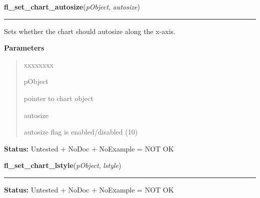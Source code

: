 \hspace{.8\funcindent}\begin{boxedminipage}{\funcwidth}

    \raggedright \textbf{fl\_set\_chart\_autosize}(\textit{pObject}, \textit{autosize})

    \vspace{-1.5ex}

    \rule{\textwidth}{0.5\fboxrule}
\setlength{\parskip}{2ex}
    Sets whether the chart should autosize along the x-axis.

\setlength{\parskip}{1ex}
      \textbf{Parameters}
      \vspace{-1ex}

      \begin{quote}
        \begin{Ventry}{xxxxxxxx}

          \item[pObject]

          pointer to chart object

          \item[autosize]

          autosize flag is enabled/disabled (1{\textbar}0)

        \end{Ventry}

      \end{quote}

\textbf{Status:} Untested + NoDoc + NoExample = NOT OK



    \end{boxedminipage}

    \label{xformslib:library:fl_set_chart_lstyle}

    \vspace{0.5ex}

\hspace{.8\funcindent}\begin{boxedminipage}{\funcwidth}

    \raggedright \textbf{fl\_set\_chart\_lstyle}(\textit{pObject}, \textit{lstyle})

    \vspace{-1.5ex}

    \rule{\textwidth}{0.5\fboxrule}
\setlength{\parskip}{2ex}
\setlength{\parskip}{1ex}
\textbf{Status:} Untested + NoDoc + NoExample = NOT OK



    \end{boxedminipage}

